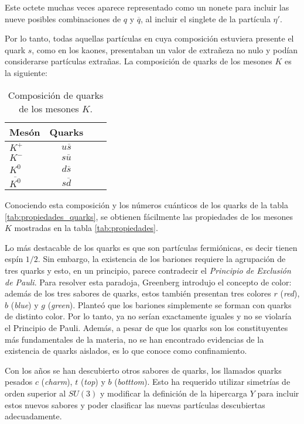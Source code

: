 Este octete muchas veces aparece representado como un nonete para incluir las nueve posibles combinaciones de $q$ y $\overline{q}$, al incluir el singlete de la partícula $\eta'$.

Por lo tanto, todas aquellas partículas en cuya composición estuviera presente el quark $s$, como en los kaones, presentaban un valor de extrañeza no nulo y podían considerarse partículas extrañas. La composición de quarks de los mesones $K$ es la siguiente:

\begin{table}[h]
	\centering
	\begin{tabular}{l*{2}{c}r}
\hline
Mesón & Quarks\\ 
\hline
$K^+$ & $u\overline{s}$\\
$K^-$ & $s\overline{u}$\\
$K^0$ & $d\overline{s}$\\
$\overline{K^0}$ & $s\overline{d}$\\
\hline
	\end{tabular}
\caption[Composición de quarks de los mesones $K$]{Composición de quarks de los mesones $K$. \cite{notas2020}} 
\label{tab:mesonesK_quarks}
\end{table}

Conociendo esta composición y los números cuánticos de los quarks de la tabla \ref{tab:propiedades_quarks}, se obtienen fácilmente las propiedades de los mesones $K$ mostradas en la tabla \ref{tab:propiedades}.

Lo más destacable de los quarks es que son partículas fermiónicas, es decir tienen espín $1/2$. Sin embargo, la existencia de los bariones requiere la agrupación de tres quarks y esto, en un principio, parece contradecir el \textit{Principio de Exclusión de Pauli}. Para resolver esta paradoja, Greenberg introdujo el concepto de color: además de los tres sabores de quarks, estos también presentan tres colores $r$ (\textit{red}), $b$ (\textit{blue}) y $g$ (\textit{green}). Planteó que los bariones simplemente se forman con quarks de distinto color. Por lo tanto, ya no serían exactamente iguales y no se violaría el Principio de Pauli.\cite{Griffiths2008}  Además, a pesar de que los quarks son los constituyentes más fundamentales de la materia, no se han encontrado evidencias de la existencia de quarks aislados, es lo que conoce como confinamiento.\cite{Pais}

Con los años se han descubierto otros sabores de quarks, los llamados quarks pesados $c$ (\textit{charm}), $t$ (\textit{top}) y $b$ (\textit{botttom}). Esto ha requerido utilizar simetrías de orden superior al $SU(3)$ y modificar la definición de la hipercarga $Y$ para incluir estos nuevos sabores y poder clasificar las nuevas partículas descubiertas adecuadamente.

